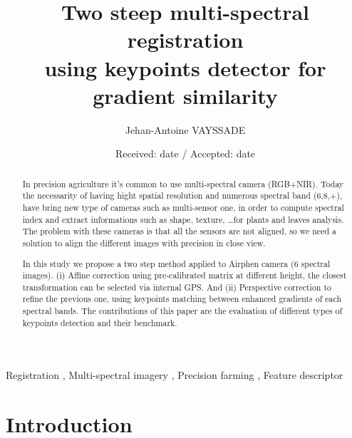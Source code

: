 \documentclass[]{elsarticle}
\begin{document}
	
	\onecolumn
	
	\begin{abstract}
		In precision agriculture it's common to use multi-spectral camera (RGB+NIR).
		Today the necessarity of having hight spatial resolution and numerous spectral band (6,8,+), have bring new type of cameras such as multi-sensor one,
		in order to compute spectral index and extract informations such as shape, texture, \dots for plants and leaves analysis.
		The problem with these cameras is that all the sensors are not aligned, so we need a solution to align the different images with precision in close view.
		
		In this study we propose a two step method applied to Airphen camera (6 spectral images).
		(i) Affine correction using pre-calibrated matrix at different height, the closest transformation can be selected via internal GPS.
		And (ii) Perspective correction to refine the previous one, using keypoints matching between enhanced gradients of each spectral bands.
		The contributions of this paper are the evaluation of different types of keypoints detection and their benchmark.
	\end{abstract}
	
	\begin{keyword}
		Registration \sep
		Multi-spectral imagery \sep
		Precision farming \sep
		Feature descriptor
	\end{keyword}
	
	\begin{frontmatter}
		\title{Two steep multi-spectral registration \\ using keypoints detector for gradient similarity}
		\author[unilu]{Jehan-Antoine VAYSSADE} 
		\address[myuni]{Agrosup D2A2E pole GestAd equipe agriculture de precision 21000 Dijon, France}
		\date{Received: date / Accepted: date}
	\end{frontmatter}
	
	\newpage
	\twocolumn
	
	\section{Introduction}
	
\end{document}
